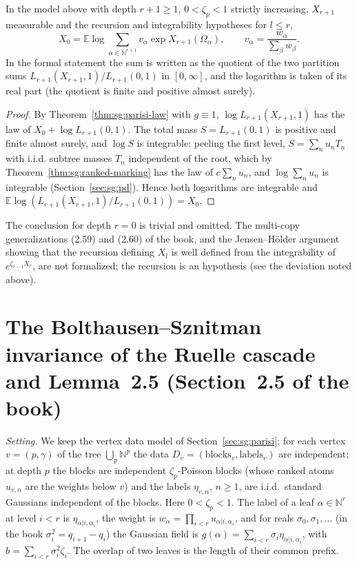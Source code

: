 \begin{theorem}[Theorem~2.9]\label{thm:sg:parisi-29}
  \leanok
In the model above with depth $r+1\ge1$, $0<\zeta_p<1$ strictly increasing, $X_{r+1}$ measurable and
the recursion and integrability hypotheses for $l\le r$,
\[
  X_0=\mathbb E\log\sum_{\alpha\in\mathbb N^{r+1}}v_\alpha\exp X_{r+1}(\Omega_\alpha),\qquad
  v_\alpha=\frac{w_\alpha}{\sum_\beta w_\beta}.
\]
In the formal statement the sum is written as the quotient of the two partition sums
$L_{r+1}(X_{r+1},1)/L_{r+1}(0,1)$ in $[0,\infty]$, and the logarithm is taken of its real part
(the quotient is finite and positive almost surely).
\end{theorem}
\begin{proof}
  \leanok
By Theorem~\ref{thm:sg:parisi-law} with $g\equiv1$, $\log L_{r+1}(X_{r+1},1)$ has the law of
$X_0+\log L_{r+1}(0,1)$. The total mass $S=L_{r+1}(0,1)$ is positive and finite almost surely, and
$\log S$ is integrable: peeling the first level, $S=\sum_nu_nT_n$ with i.i.d. subtree masses $T_n$
independent of the root, which by Theorem~\ref{thm:sg:ranked-marking} has the law of
$c\sum_nu_n$, and $\log\sum_nu_n$ is integrable (Section~\ref{sec:sg:pd}). Hence both logarithms are integrable and
$\mathbb E\log(L_{r+1}(X_{r+1},1)/L_{r+1}(0,1))=X_0$.
\end{proof}

\begin{remark}
The conclusion for depth $r=0$ is trivial and omitted. The multi-copy generalizations (2.59) and (2.60)
of the book, and the Jensen--H\"older argument showing that the recursion defining $X_l$ is
well defined from the integrability of $e^{\zeta_{r-1}X_r}$, are not formalized; the recursion is an hypothesis
(see the deviation noted above).
\end{remark}

\section{The Bolthausen--Sznitman invariance of the Ruelle cascade and Lemma~2.5 (Section~2.5 of the book)}\label{sec:sg:bs-cascade}

\emph{Setting.} We keep the vertex data model of Section~\ref{sec:sg:parisi}: for each vertex $v=(p,\gamma)$ of the tree
$\bigcup_p\mathbb N^p$ the data $D_v=(\text{blocks}_v,\text{labels}_v)$ are independent; at depth $p$ the blocks are
independent $\zeta_p$-Poisson blocks (whose ranked atoms $u_{v,n}$ are the weights below $v$) and the labels
$\eta_{v,n}$, $n\ge1$, are i.i.d.\ standard Gaussians independent of the blocks. Here $0<\zeta_p<1$. The label of a
leaf $\alpha\in\mathbb N^r$ at level $i<r$ is $\eta_{\alpha|i,\alpha_i}$, the weight is $w_\alpha=\prod_{i<r}u_{\alpha|i,\alpha_i}$,
and for reals $\sigma_0,\sigma_1,\dots$ (in the book $\sigma_i^2=q_{i+1}-q_i$) the Gaussian field is
$g(\alpha)=\sum_{i<r}\sigma_i\eta_{\alpha|i,\alpha_i}$, with $b=\sum_{i<r}\sigma_i^2\zeta_i$. The overlap of two leaves is
the length of their common prefix.

